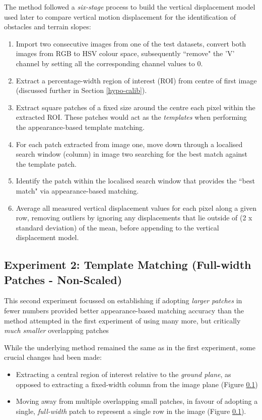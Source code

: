 The method followed a \textit{six-stage} process to build the vertical displacement model used later to compare vertical motion displacement for the identification of obstacles and terrain slopes:

\begin{enumerate}
\item Import two consecutive images from one of the test datasets, convert both images from RGB to HSV colour space, subsequently ``remove" the 'V' channel by setting all the corresponding channel values to 0.
\item Extract a percentage-width region of interest (ROI) from centre of first image (discussed further in Section \ref{hypo-calib}).
\item Extract square patches of a fixed size around the centre each pixel within the extracted ROI. These patches would act as the \textit{templates} when performing the appearance-based template matching. 
\item For each patch extracted from image one, move down through a localised search window (column) in image two searching for the best match against the template patch.
\item Identify the patch within the localised search window that provides the ``best match" via appearance-based matching.
\item Average all measured vertical displacement values for each pixel along a given row, removing outliers by ignoring any displacements that lie outside of (2 x standard deviation) of the mean, before appending to the vertical displacement model.
\end{enumerate}

\subsection{Experiment 2: Template Matching (Full-width Patches - Non-Scaled)}

This second experiment focussed on establishing if adopting \textit{larger patches} in fewer numbers provided better appearance-based matching accuracy than the method attempted in the first experiment of using many more, but critically \textit{much smaller} overlapping patches 

 While the underlying method remained the same as in the first experiment, some crucial changes had been made:
 
 \begin{itemize}
 	\item Extracting a central region of interest relative to the \textit{ground plane}, as opposed to extracting a fixed-width column from the image plane (Figure \ref{})
 	\item Moving away from multiple overlapping small patches, in favour of adopting a single, \textit{full-width} patch to represent a single row in the image (Figure \ref{}). 
 \end{itemize}

